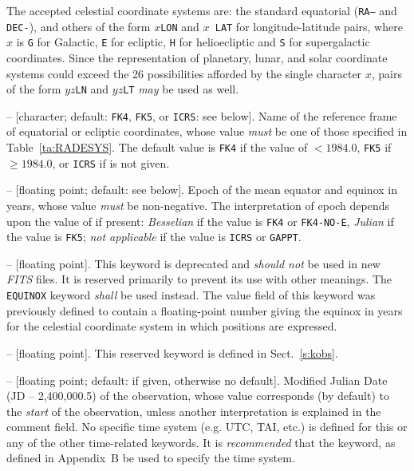 \documentclass[onecolumn]{aa}
\begin{document}
The accepted celestial coordinate systems are: the standard equatorial
(\texttt{RA--} and \texttt{DEC-}), and others of the form $x${\tt LON} and $x${\tt
LAT} for longitude-latitude pairs, where $x$ is {\tt G} for Galactic, {\tt E} for
ecliptic, {\tt H} for helioecliptic and {\tt S} for supergalactic coordinates.
Since the representation of planetary, lunar, and solar coordinate systems could
exceed the 26 possibilities afforded by the single character $x$, pairs of the
form $yz${\tt LN} and $yz${\tt LT} {\em may} be used as well. 

\begin{description}

\item {}  -- [character; default: \texttt{FK4}, \texttt{FK5}, or
\texttt{ICRS}: see below]. 
Name of the reference frame of equatorial or ecliptic
coordinates, whose value {\em must} be one of those specified in Table~\ref{ta:RADESYS}. The
default value is \texttt{FK4} if the value of  $<1984.0$,
\texttt{FK5} if  $\geq1984.0$, or \texttt{ICRS} if
 is not given.


\item {}  -- [floating point; default: see below]. 
Epoch of the mean
equator and equinox in years, whose value {\em must} be non-negative. The
interpretation of epoch depends upon the value of  if present:
{\em Besselian} if the value is \texttt{FK4} or \texttt{FK4-NO-E}, {\em Julian}
if the value is \texttt{FK5}; {\em not applicable} if the value is \texttt{ICRS}
or \texttt{GAPPT}. 

\item {}  -- [floating point]. 
  This keyword is deprecated  and {\em should not} be used in new 
  {\em FITS\/} files.  It is reserved primarily to prevent its use
  with other meanings.  The {\tt EQUINOX} keyword 
  {\em shall} be used instead.  The value field of this
  keyword was previously defined to contain a floating-point number
 giving the equinox in years for the celestial 
 coordinate system
 in which positions are expressed.


\item {}  -- [floating point].
This reserved keyword is defined in Sect.\ \ref{s:kobs}. 

\item {}  -- [floating point; default:  if given,
otherwise no default]. 
Modified Julian Date (JD -- 2,400,000.5) of the
observation, whose value corresponds (by default) to the {\em start} of the
observation, unless another interpretation is explained in the comment field. 
No specific time system (e.g. UTC, TAI, etc.) is defined for this or any of
the other time-related keywords.  It is {\em recommended} that 
the  keyword, as defined in Appendix~B be used to specify the
time system.


\end{description}
\end{document}
